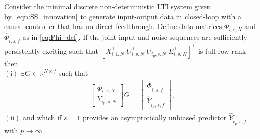 \begin{thm}\label{theorem:main_result}
    Consider the minimal discrete non-deterministic \ac{LTI} system given by~\eqref{eqn:SS_innovation} to generate input-output data in closed-loop with a causal controller that has no direct feedthrough. Define data matrices $\Phi_{i,s,N}$ and $\overline{\Phi}_{\hat{i},s,f}$ as in \eqref{eq:Phi_def}. %
    If the joint input and noise sequences are sufficiently persistently exciting such that $\left[X_{i,1,N}^\top \; U_{i,p,N}^\top \; U_{i_p,s,N}^\top \; E_{i,p,N}^\top\right]^\top$ is full row rank %
    then \\
    $\mathrm{(i)}$ $\exists G\in\mathbb{R}^{N\times f}$ such that
    \begin{align}\label{eq:Theorem1}
        \begin{bmatrix}
            \Phi_{i,s,N}\\Y_{i_p,s,N}
        \end{bmatrix}G =
        \begin{bmatrix}
            \overline{\Phi}_{\hat{i},s,f}\\\widehat{Y}_{\hat{i}_p,s,f}
        \end{bmatrix},
    \end{align}
    $\mathrm{(ii)}$ and which if $s=1$ provides an asymptotically unbiased predictor $\widehat{Y}_{\hat{i}_p,s,f}$ with $p\rightarrow\infty$.
\end{thm}

